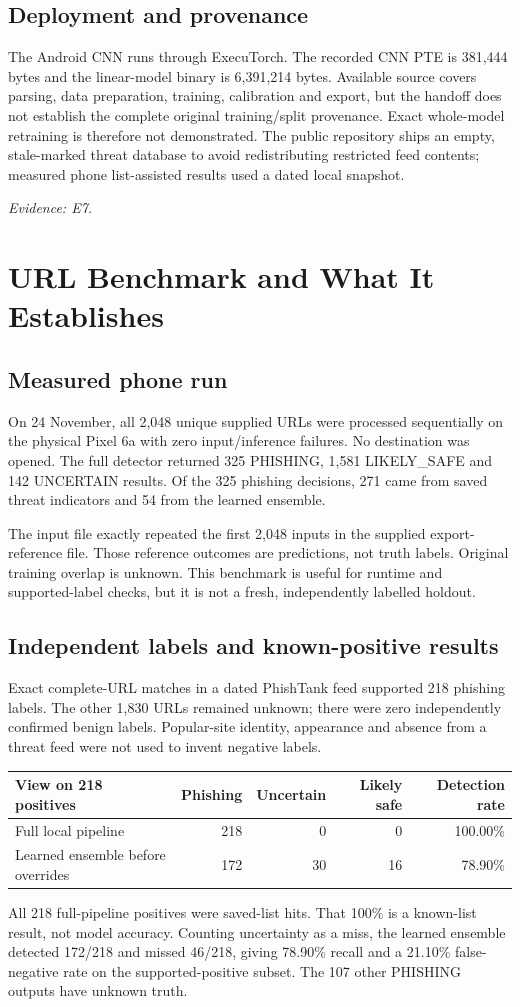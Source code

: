 \documentclass[11pt,a4paper]{article}
\newcommand{\source}[1]{{\small\textit{Evidence: #1.}\par}}
\newcommand{\chapterpage}[1]{\clearpage\section{#1}}
\begin{document}
\subsection*{Deployment and provenance}
The Android CNN runs through ExecuTorch. The recorded CNN PTE is 381,444 bytes and the
linear-model binary is 6,391,214 bytes. Available source covers parsing, data preparation,
training, calibration and export, but the handoff does not establish the complete original
training/split provenance. Exact whole-model retraining is therefore not demonstrated.
The public repository ships an empty, stale-marked threat database to avoid redistributing
restricted feed contents; measured phone list-assisted results used a dated local snapshot.
\source{E7}

\chapterpage{URL Benchmark and What It Establishes}
\subsection*{Measured phone run}
On 24 November, all 2,048 unique supplied URLs were processed sequentially on the physical
Pixel 6a with zero input/inference failures. No destination was opened. The full detector
returned 325 PHISHING, 1,581 LIKELY\_SAFE and 142 UNCERTAIN results. Of the 325 phishing
decisions, 271 came from saved threat indicators and 54 from the learned ensemble.

The input file exactly repeated the first 2,048 inputs in the supplied export-reference
file. Those reference outcomes are predictions, not truth labels. Original training overlap
is unknown. This benchmark is useful for runtime and supported-label checks, but it is
not a fresh, independently labelled holdout.

\subsection*{Independent labels and known-positive results}
Exact complete-URL matches in a dated PhishTank feed supported 218 phishing labels.
The other 1,830 URLs remained unknown; there were zero independently confirmed benign
labels. Popular-site identity, appearance and absence from a threat feed were not used
to invent negative labels.

\begin{center}\small
\begin{tabular}{@{}lrrrr@{}}
\toprule View on 218 positives & Phishing & Uncertain & Likely safe & Detection rate\\\midrule
Full local pipeline & 218 & 0 & 0 & 100.00\%\\
Learned ensemble before overrides & 172 & 30 & 16 & 78.90\%\\
\bottomrule
\end{tabular}
\end{center}
All 218 full-pipeline positives were saved-list hits. That 100\% is a known-list result,
not model accuracy. Counting uncertainty as a miss, the learned ensemble detected
172/218 and missed 46/218, giving 78.90\% recall and a 21.10\% false-negative rate
on the supported-positive subset. The 107 other PHISHING outputs have unknown truth.
\end{document}
